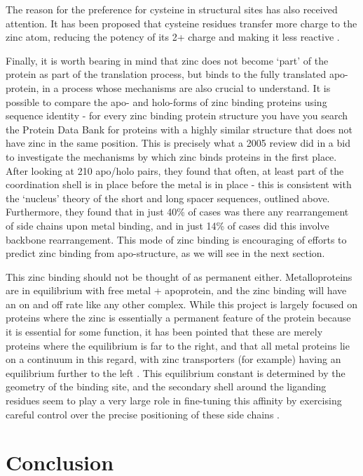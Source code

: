 The reason for the preference for cysteine in structural sites has also received attention. It has been proposed that cysteine residues transfer more charge to the zinc atom, reducing the potency of its 2+ charge and making it less reactive \cite{lee2008physical}. 

Finally, it is worth bearing in mind that zinc does not become `part' of the protein as part of the translation process, but binds to the fully translated apo-protein, in a process whose mechanisms are also crucial to understand. It is possible to compare the apo- and holo-forms of zinc binding proteins using sequence identity - for every zinc binding protein structure you have you search the Protein Data Bank for proteins with a highly similar structure that does not have zinc in the same position. This is precisely what a 2005 review did \cite{babor2005flexibility} in a bid to investigate the mechanisms by which zinc binds proteins in the first place. After looking at 210 apo/holo pairs, they found that often, at least part of the coordination shell is in place before the metal is in place - this is consistent with the `nucleus' theory of the short and long spacer sequences, outlined above. Furthermore, they found that in just 40\% of cases was there any rearrangement of side chains upon metal binding, and in just 14\% of cases did this involve backbone rearrangement. This mode of zinc binding is encouraging of efforts to predict zinc binding from apo-structure, as we will see in the next section.

This zinc binding should not be thought of as permanent either. Metalloproteins are in equilibrium with free metal + apoprotein, and the zinc binding will have an on and off rate like any other complex. While this project is largely focused on proteins where the zinc is essentially a permanent feature of the protein because it is essential for some function, it has been pointed that these are merely proteins where the equilibrium is far to the right, and that all metal proteins lie on a continuum in this regard, with zinc transporters (for example) having an equilibrium further to the left \cite{maret2010metalloproteomics}. This equilibrium constant is determined by the geometry of the binding site, and the secondary shell around the liganding residues seem to play a very large role in fine-tuning this affinity by exercising careful control over the precise positioning of these side chains \cite{kochanczyk2015relationship}.

\section{Conclusion}

